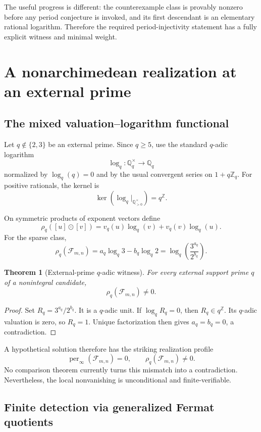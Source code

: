 \documentclass[11pt,oneside]{article}
\newtheorem{theorem}{Theorem}[section]
\theoremstyle{definition}
\newcommand{\Z}{\mathbb Z}
\newcommand{\Q}{\mathbb Q}
\newcommand{\per}{\operatorname{per}}
\begin{document}
The useful progress is different: the counterexample class is provably nonzero before any period conjecture is invoked, and its first descendant is an elementary rational logarithm.  Therefore the required period-injectivity statement has a fully explicit witness and minimal weight.

\section{A nonarchimedean realization at an external prime}

\subsection{The mixed valuation--logarithm functional}

Let $q\notin\{2,3\}$ be an external prime.  Since $q\ge5$, use the standard $q$-adic logarithm
\[
  \log_q:\Q_q^\times\longrightarrow\Q_q
\]
normalized by $\log_q(q)=0$ and by the usual convergent series on $1+q\Z_q$.  For positive rationals, the kernel is
\[
  \ker(\log_q|_{\Q_{>0}^\times})=q^\Z.
\]

On symmetric products of exponent vectors define
\[
 \rho_q([u]\odot[v])
 =v_q(u)\log_q(v)+v_q(v)\log_q(u).
\]
For the sparse class,
\begin{equation}\label{eq:localrho}
 \rho_q(\mathcal F_{m,n})
 =a_q\log_q3-b_q\log_q2
 =\log_q\!\left(\frac{3^{a_q}}{2^{b_q}}\right).
\end{equation}

\begin{theorem}[External-prime $q$-adic witness]\label{thm:qadicwitness}
For every external support prime $q$ of a nonintegral candidate,
\[
  \rho_q(\mathcal F_{m,n})\ne0.
\]
\end{theorem}

\begin{proof}
Set $R_q=3^{a_q}/2^{b_q}$.  It is a $q$-adic unit.  If $\log_qR_q=0$, then $R_q\in q^\Z$.  Its $q$-adic valuation is zero, so $R_q=1$.  Unique factorization then gives $a_q=b_q=0$, a contradiction.
\end{proof}

A hypothetical solution therefore has the striking realization profile
\[
  \per_\infty(\mathcal F_{m,n})=0,
  \qquad
  \rho_q(\mathcal F_{m,n})\ne0.
\]
No comparison theorem currently turns this mismatch into a contradiction.  Nevertheless, the local nonvanishing is unconditional and finite-verifiable.

\subsection{Finite detection via generalized Fermat quotients}
\end{document}
